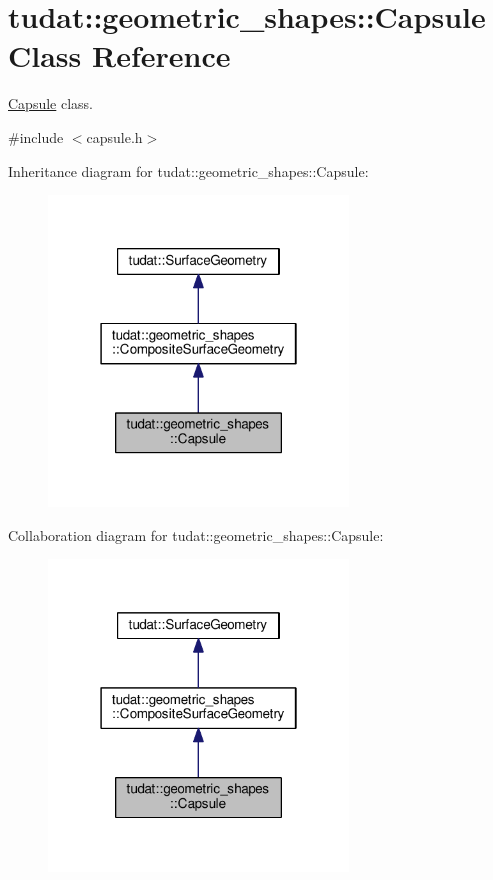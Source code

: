 \hypertarget{classtudat_1_1geometric__shapes_1_1Capsule}{}\section{tudat\+:\+:geometric\+\_\+shapes\+:\+:Capsule Class Reference}
\label{classtudat_1_1geometric__shapes_1_1Capsule}


\hyperlink{classtudat_1_1geometric__shapes_1_1Capsule}{Capsule} class.  




{\ttfamily \#include $<$capsule.\+h$>$}



Inheritance diagram for tudat\+:\+:geometric\+\_\+shapes\+:\+:Capsule\+:
\nopagebreak
\begin{figure}[H]
\begin{center}
\leavevmode
\includegraphics[width=226pt]{classtudat_1_1geometric__shapes_1_1Capsule__inherit__graph}
\end{center}
\end{figure}


Collaboration diagram for tudat\+:\+:geometric\+\_\+shapes\+:\+:Capsule\+:
\nopagebreak
\begin{figure}[H]
\begin{center}
\leavevmode
\includegraphics[width=226pt]{classtudat_1_1geometric__shapes_1_1Capsule__coll__graph}
\end{center}
\end{figure}
